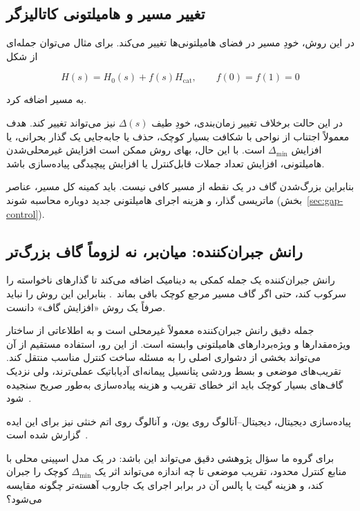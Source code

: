 \subsection{تغییر مسیر و هامیلتونی کاتالیزگر}

در این روش، خودِ مسیر در فضای هامیلتونی‌ها تغییر می‌کند.
برای مثال می‌توان جمله‌ای از شکل

\begin{equation}
	H(s)
	=
	H_0(s)
	+
	f(s)H_{\mathrm{cat}},
	\qquad
	f(0)=f(1)=0
\end{equation}

به مسیر اضافه کرد.

در این حالت برخلاف تغییر زمان‌بندی، خودِ طیف $\Delta(s)$ نیز می‌تواند تغییر کند.
هدف معمولاً اجتناب از نواحی با شکافت بسیار کوچک، حذف یا جابه‌جایی یک گذار بحرانی، یا افزایش $\Delta_{\min}$ است.
با این حال، بهای روش ممکن است افزایش غیرمحلی‌شدن هامیلتونی، افزایش تعداد جملات قابل‌کنترل یا افزایش پیچیدگی پیاده‌سازی باشد.

بنابراین بزرگ‌شدن گاف در یک نقطه از مسیر کافی نیست.
باید کمینه کل مسیر، عناصر ماتریسی گذار، و هزینه اجرای هامیلتونی جدید دوباره محاسبه شوند (بخش~\ref{sec:gap-control}).

\subsection{رانش جبران‌کننده: میان‌بر، نه لزوماً گاف بزرگ‌تر}

رانش جبران‌کننده یک جمله کمکی به دینامیک اضافه می‌کند تا گذارهای ناخواسته را سرکوب کند، حتی اگر گاف مسیر مرجع کوچک باقی بماند~\cite{Berry2009STA,GapSels2017}.
بنابراین این روش را نباید صرفاً یک روش «افزایش گاف» دانست.

جمله دقیق رانش جبران‌کننده معمولاً غیرمحلی است و به اطلاعاتی از ساختار ویژه‌مقدارها و ویژه‌بردارهای هامیلتونی وابسته است.
از این رو، استفاده مستقیم از آن می‌تواند بخشی از دشواری اصلی را به مسئله ساخت کنترل مناسب منتقل کند.
تقریب‌های موضعی و بسط وردشی پتانسیل پیمانه‌ای آدیاباتیک عملی‌ترند، ولی نزدیک گاف‌های بسیار کوچک باید اثر خطای تقریب و هزینه پیاده‌سازی به‌طور صریح سنجیده شود~\cite{Gueneau2025CD}.

پیاده‌سازی دیجیتال، دیجیتال--آنالوگ روی یون، و آنالوگ روی اتم خنثی نیز برای این ایده گزارش شده است~\cite{Kumar2024DACQO,ACQC2026}.

برای گروه ما سؤال پژوهشی دقیق می‌تواند این باشد:
در یک مدل اسپینی محلی با منابع کنترل محدود، تقریب موضعی  تا چه اندازه می‌تواند اثر یک $\Delta_{\min}$ کوچک را جبران کند، و هزینه گیت یا پالس آن در برابر اجرای یک جاروب آهسته‌تر چگونه مقایسه می‌شود؟


